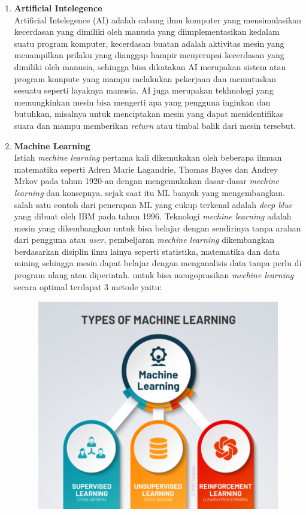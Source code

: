 \begin{enumerate}
  \item \textbf{Artificial Intelegence} \\
    Artificial Intelegence (AI) adalah cabang ilmu komputer yang mensimulasikan kecerdasan yang dimiliki oleh manusia yang diimplementasikan kedalam suatu program komputer, kecerdasan buatan adalah aktivitas mesin yang menampilkan prilaku yang dianggap hampir menyerupai kecerdasan yang dimiliki oleh manusia, sehingga bisa dikatakan AI merupakan sistem atau program kompute yang mampu melakukan pekerjaan dan memutuskan sesuatu seperti layaknya manusia.
    AI juga merupakan tekhnologi yang memungkinkan mesin bisa mengerti apa yang pengguna inginkan dan butuhkan, misalnya untuk menciptakan mesin yang dapat menidentifikas suara dan mampu memberikan \textit{return} atau timbal balik dari mesin tersebut. 
  \item \textbf{Machine Learning}  \\
    Istiah \textit{mechine learning}  pertama kali dikemukakan oleh beberapa ilmuan matematika seperti Adren Marie Lagandrie, Thomas Bayes dan Andrey Mrkov pada tahun 1920-an dengan mengemukakan dasar-dasar \textit{mechine learning} dan konsepnya. sejak saat itu ML banyak yang mengembangkan. salah satu contoh dari penerapan ML yang cukup terkenal adalah \textit{deep blue} yang dibuat oleh IBM pada tahun 1996.
    Teknologi \textit{mechine learning}  adalah mesin yang dikembangkan untuk bisa belajar dengan sendirinya tanpa arahan dari pengguna atau \textit{user}, pembeljaran \textit{mechine learning}  dikembangkan berdasarkan disiplin ilmu lainya seperti statistika, matematika dan data mining sehingga mesin dapat belajar dengan menganalisis data tanpa perlu di program ulang atau diperintah.
    untuk bisa mengoprasikan \textit{mechine learning} secara optimal terdapat 3 metode yaitu: 
    \begin{figure} [ht] \centering
      \includegraphics[scale=0.9]{gambar/metode_ML.png}

\end{figure}
\end{enumerate}
